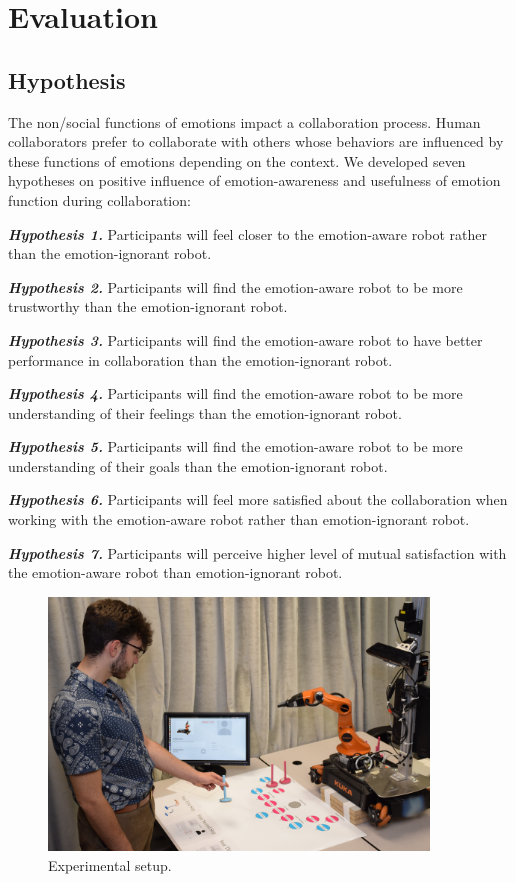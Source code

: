 \documentclass[12pt]{report}
\begin{document}
\section{Evaluation}
\subsection{Hypothesis}

The non/social functions of emotions impact a collaboration process. Human
collaborators prefer to collaborate with others whose behaviors are influenced
by these functions of emotions depending on the context. We developed seven
hypotheses on positive influence of emotion-awareness and usefulness of emotion
function during collaboration:

\textit{\textbf{Hypothesis 1.}} Participants will feel closer to the emotion-aware
robot rather than the emotion-ignorant robot.

\textit{\textbf{Hypothesis 2.}} Participants will find the emotion-aware robot to be
more trustworthy than the emotion-ignorant robot.

\textit{\textbf{Hypothesis 3.}} Participants will find the emotion-aware robot to
have better performance in collaboration than the emotion-ignorant robot.

\textit{\textbf{Hypothesis 4.}} Participants will find the emotion-aware robot to be
more understanding of their feelings than the emotion-ignorant robot.

\textit{\textbf{Hypothesis 5.}} Participants will find the emotion-aware robot to be
more understanding of their goals than the emotion-ignorant robot.

\textit{\textbf{Hypothesis 6.}} Participants will feel more satisfied about the
collaboration when working with the emotion-aware robot rather than
emotion-ignorant robot.

\textit{\textbf{Hypothesis 7.}} Participants will perceive higher level of mutual
satisfaction with the emotion-aware robot than emotion-ignorant robot.

\begin{figure}
  \centering
  \includegraphics[width=0.9\textwidth]{figure/environment.png}
  \caption{\fontsize{10}{10}\selectfont Experimental setup.}
  \label{fig:environment}
\end{figure}
\end{document}
